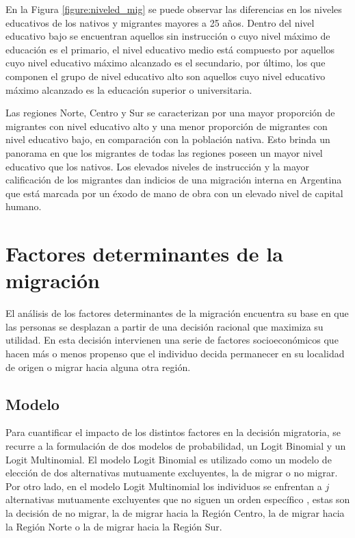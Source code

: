 \documentclass[12pt,a4paper]{article}
\begin{document}
En la Figura \ref{figure:niveled_mig} se puede observar las diferencias en los niveles educativos de los nativos y migrantes mayores a 25 años. Dentro del nivel educativo bajo se encuentran aquellos sin instrucción o cuyo nivel máximo de educación es el primario, el nivel educativo medio está compuesto por aquellos cuyo nivel educativo máximo alcanzado es el secundario, por último, los que componen el grupo de nivel educativo alto son aquellos cuyo nivel educativo máximo alcanzado es la educación superior o universitaria.

Las regiones Norte, Centro y Sur se caracterizan por una mayor proporción de migrantes con nivel educativo alto y una menor proporción de migrantes con nivel educativo bajo, en comparación con la población nativa. Esto brinda un panorama en que los migrantes de todas las regiones poseen un mayor nivel educativo que los nativos. Los elevados niveles de instrucción y la mayor calificación de los migrantes dan indicios de una migración interna en Argentina que está marcada por un éxodo de mano de obra con un elevado nivel de capital humano.


\newpage
\section{Factores determinantes de la migración}
El análisis de los factores determinantes de la migración  encuentra su base en que las personas se desplazan a partir de una decisión racional que maximiza su utilidad. En esta decisión intervienen una serie de factores socioeconómicos que hacen más o menos propenso que el individuo decida permanecer en su localidad de origen o migrar hacia alguna otra región.
\subsection{Modelo}
Para cuantificar el impacto de los distintos factores en la decisión migratoria, se recurre a la formulación de dos modelos de probabilidad, un Logit Binomial y un Logit Multinomial. El modelo Logit Binomial es utilizado como un modelo de elección de dos alternativas mutuamente excluyentes, la de migrar o no migrar. Por otro lado, en el modelo Logit Multinomial los individuos se enfrentan a $j$ alternativas mutuamente excluyentes que no siguen un orden específico \parencite{greene_econometric_2018}, estas son la decisión de no migrar, la de migrar hacia la Región Centro, la de migrar hacia la Región Norte o la de migrar hacia la Región Sur.
\end{document}
